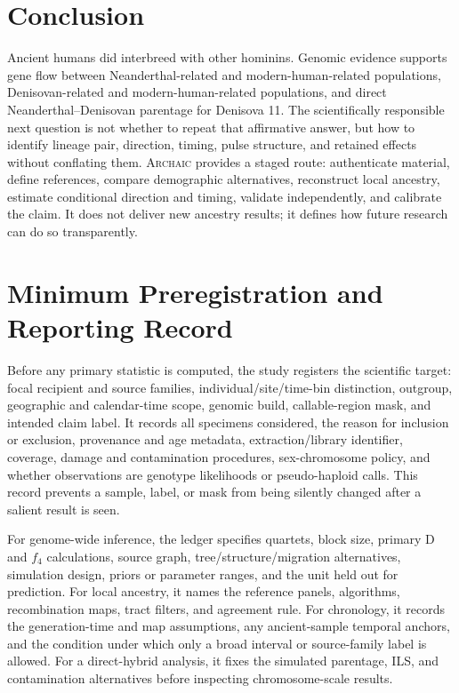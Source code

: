 \documentclass[conference]{IEEEtran}
\newcommand{\archaic}{\textsc{Archaic}}
\begin{document}
\section{Conclusion}

Ancient humans did interbreed with other hominins. Genomic evidence supports gene flow between Neanderthal-related and modern-human-related populations, Denisovan-related and modern-human-related populations, and direct Neanderthal--Denisovan parentage for Denisova 11. The scientifically responsible next question is not whether to repeat that affirmative answer, but how to identify lineage pair, direction, timing, pulse structure, and retained effects without conflating them. \archaic{} provides a staged route: authenticate material, define references, compare demographic alternatives, reconstruct local ancestry, estimate conditional direction and timing, validate independently, and calibrate the claim. It does not deliver new ancestry results; it defines how future research can do so transparently.

\appendices
\section{Minimum Preregistration and Reporting Record}

Before any primary statistic is computed, the study registers the scientific target: focal recipient and source families, individual/site/time-bin distinction, outgroup, geographic and calendar-time scope, genomic build, callable-region mask, and intended claim label. It records all specimens considered, the reason for inclusion or exclusion, provenance and age metadata, extraction/library identifier, coverage, damage and contamination procedures, sex-chromosome policy, and whether observations are genotype likelihoods or pseudo-haploid calls. This record prevents a sample, label, or mask from being silently changed after a salient result is seen.

For genome-wide inference, the ledger specifies quartets, block size, primary D and $f_4$ calculations, source graph, tree/structure/migration alternatives, simulation design, priors or parameter ranges, and the unit held out for prediction. For local ancestry, it names the reference panels, algorithms, recombination maps, tract filters, and agreement rule. For chronology, it records the generation-time and map assumptions, any ancient-sample temporal anchors, and the condition under which only a broad interval or source-family label is allowed. For a direct-hybrid analysis, it fixes the simulated parentage, ILS, and contamination alternatives before inspecting chromosome-scale results.
\end{document}
